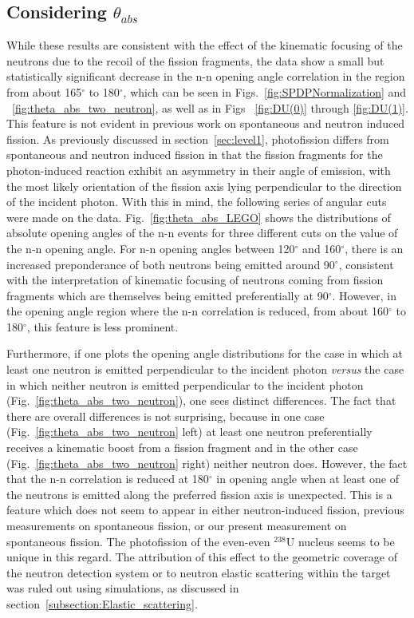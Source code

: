 \subsection{Considering $\theta_{abs}$}
\label{sec:anomaly}
While these results are consistent with the effect of the kinematic focusing of the neutrons due to the recoil of the fission fragments, the data show a small but statistically significant decrease in the n-n opening angle correlation in the region from about 165$^{\circ}$ to 180$^{\circ}$, which can be seen in Figs.~\ref{fig:SPDPNormalization} and ~\ref{fig:theta_abs_two_neutron}, as well as in Figs ~\ref{fig:DU(0)} through \ref{fig:DU(1)}.
This feature is not evident in previous work on spontaneous and neutron induced fission.
As previously discussed in section~\ref{sec:level1}, photofission differs from spontaneous and neutron induced fission in that the fission fragments for the photon-induced reaction exhibit an asymmetry in their angle of emission, with the most likely orientation of the fission axis lying perpendicular to the direction of the incident photon.
With this in mind, the following series of angular cuts were made on the data.
Fig.~\ref{fig:theta_abs_LEGO} shows the distributions of absolute opening angles of the n-n events for three different cuts on the value of the n-n opening angle.
For n-n opening angles between 120$^{\circ}$ and 160$^{\circ}$, there is an increased preponderance of both neutrons being emitted around 90$^{\circ}$, consistent with the interpretation of kinematic focusing of neutrons coming from fission fragments which are themselves being emitted preferentially at 90$^{\circ}$.
However, in the opening angle region where the n-n correlation is reduced, from about 160$^{\circ}$ to 180$^{\circ}$, this feature is less prominent.

Furthermore, if one plots the opening angle distributions for the case in which at least one neutron is emitted perpendicular to the incident photon \emph{versus} the case in which neither neutron is emitted perpendicular to the incident photon (Fig.~\ref{fig:theta_abs_two_neutron}), one sees distinct differences.
The fact that there are overall differences is not surprising, because in one case (Fig.~\ref{fig:theta_abs_two_neutron} left) at least one neutron preferentially receives a kinematic boost from a fission fragment and in the other case (Fig.~\ref{fig:theta_abs_two_neutron} right) neither neutron does.
However, the fact that the n-n correlation is reduced at 180$^{\circ}$ in opening angle when at least one of the neutrons is emitted along the preferred fission axis is unexpected.
This is a feature which does not seem to appear in either neutron-induced fission, previous measurements on spontaneous fission, or our present measurement on spontaneous fission.
The photofission of the even-even $^{238}$U nucleus seems to be unique in this regard. 
The attribution of this effect to the geometric coverage of the neutron detection system or to neutron elastic scattering within the target was ruled out using simulations, as discussed in section~\ref{subsection:Elastic_scattering}.

